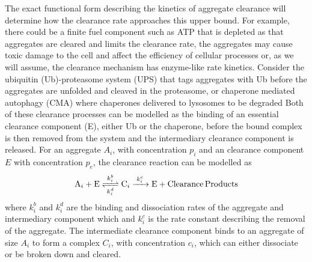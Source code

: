 The exact functional form describing the kinetics of aggregate clearance will determine how the clearance rate approaches this upper bound. For example, there could be a finite fuel component such as ATP that is depleted as that aggregates are cleared and limits the clearance rate, the aggregates may cause toxic damage to the cell and affect the efficiency of cellular processes or, as we will assume, the clearance mechanism has enzyme-like rate kinetics. Consider the ubiquitin (Ub)-proteasome system (UPS) that tags aggregates with Ub before the aggregates are unfolded and cleaved in the proteasome, or chaperone mediated autophagy (CMA) where chaperones delivered to lysosomes to be degraded \cite{ciechanover_degradation_2015}  Both of these clearance processes can be modelled as the binding of an essential clearance component (E), either Ub or the chaperone, before the bound complex is then removed from the system and the intermediary clearance component is released. For an aggregate $A_i$, with concentration $p_i$ and an clearance component $E$ with concentration $p_e$, the clearance reaction can be modelled as
\begin{equation}
        \ce{A_i + E <=>[$k_i^b$][$k_i^d$] C_i ->[$k^{c}_i$] E + Clearance Products} \label{eq:4-MM}
\end{equation}
where $k_i^b$ and $k_i^d$ are the binding and dissociation rates of the aggregate and intermediary component which and $k^{c}_i$ is the rate constant describing the removal of the aggregate. The intermediate clearance component binds to an aggregate of size $A_i$ to form a complex $C_i$, with concentration $c_i$, which can either dissociate or be broken down and cleared.

